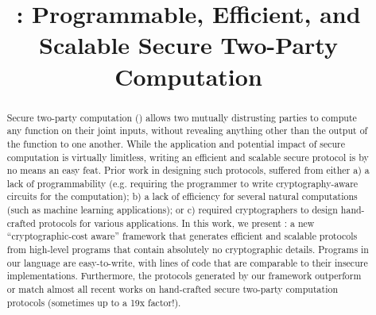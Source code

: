\documentclass[conference,compsoc]{IEEEtran}
\begin{document}
\title{\tool: Programmable, Efficient, and Scalable Secure Two-Party Computation}





\maketitle
\begin{abstract}
Secure two-party computation (\mpc) allows two mutually distrusting parties to compute any function on their joint inputs, without revealing anything other than the output of the function to one another. While the application and potential impact of secure computation is virtually limitless, writing an efficient and scalable secure protocol is by no means an easy feat. Prior work in designing such protocols, suffered from either a) a lack of programmability (e.g. requiring the programmer to write cryptography-aware circuits for the computation); b) a lack of efficiency for several natural computations (such as machine learning applications); or c) required cryptographers to design hand-crafted protocols for various applications. In this work, we present \tool: a new ``cryptographic-cost aware'' \mpc framework that generates efficient and scalable \mpc protocols from high-level programs that contain absolutely no cryptographic details. Programs in our language are easy-to-write, with lines of code that are comparable to their insecure implementations. Furthermore, the \mpc protocols generated by our framework outperform or match almost all recent works on hand-crafted secure two-party computation protocols (sometimes up to a 19x factor!).
\end{abstract}
\IEEEpeerreviewmaketitle
\end{document}
